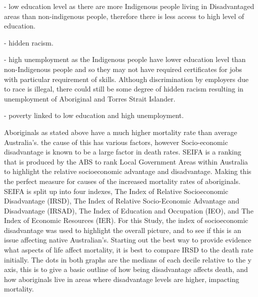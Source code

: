 \documentclass[12pt,a4paper]{article}
\begin{document}
	- low education level as there are more Indigenous people living in Disadvantaged areas than non-indigenous people, therefore there is less access to high level of education.
	
	- hidden racism.
	
	- high unemployment as the Indigenous people have lower education level than non-Indigenous people and so they may not have required certificates for jobs with particular requirement of skills. Although discrimination by employers due to race is illegal, there could still be some degree of hidden racism resulting in unemployment of Aboriginal and Torres Strait Islander.  
	
	- poverty linked to low education and high unemployment. 
	
	
	Aboriginals as stated above have a much higher mortality rate than average Australia’s. the cause of this has various factors, however Socio-economic disadvantage is known to  be a large factor in death rates.  SEIFA is a ranking that is produced by the ABS to rank Local Government Areas within Australia to highlight the relative socioeconomic advantage and disadvantage. Making this the perfect measure for causes of the increased mortality rates of aboriginals. SEIFA is split up into four indexes, The Index of Relative Socioeconomic Disadvantage (IRSD), The Index of Relative Socio-Economic Advantage and Disadvantage (IRSAD), The Index of Education and Occupation (IEO), and The Index of Economic Resources (IER).  For this Study, the index of socioeconomic disadvantage was used to highlight the overall picture, and to see if this is an issue affecting native Australian’s. Starting out the best way to provide evidence what aspects of life affect mortality, it is best to compare IRSD to the death rate initially.  The dots in both graphs are the medians of each decile relative to the y axis, this is to give a basic outline of how being disadvantage affects death, and how aboriginals live in areas where disadvantage levels are higher, impacting mortality.
\end{document}
